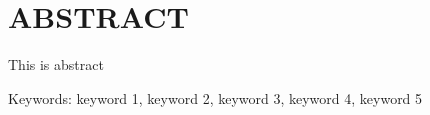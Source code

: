
\chapter*{ABSTRACT}
\vspace*{0.7cm}

\noindent This is abstract\\

\vspace*{0.2cm}

\noindent Keywords: keyword 1, keyword 2, keyword 3, keyword 4, keyword 5\\ 

\newpage